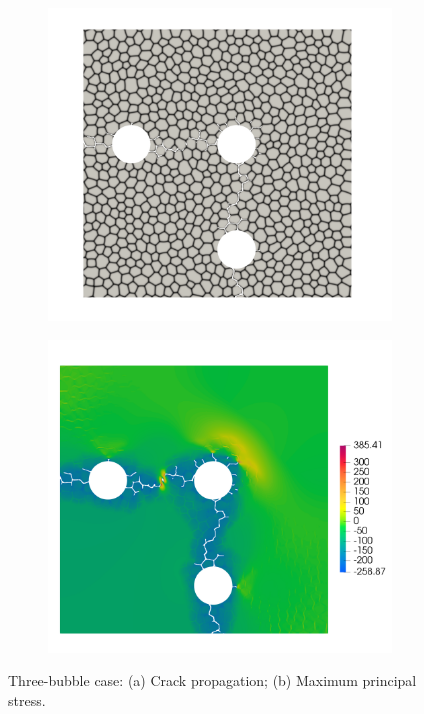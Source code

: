 \begin{figure}[htb!]
  \centering
  \begin{subfigure}[t]{0.49\linewidth}
    \centering
    \includegraphics[width=\linewidth]{Chapter3/figures/three_bubbles_bnd}
    \caption{}
  \end{subfigure}
  \begin{subfigure}[t]{0.49\linewidth}
    \centering
    \includegraphics[width=\linewidth]{Chapter3/figures/three_bubbles_stress}
    \caption{}
  \end{subfigure}
  \caption{\label{fig:three_bubbles} Three-bubble case: (a) Crack propagation; (b) Maximum principal stress.}
\end{figure}

